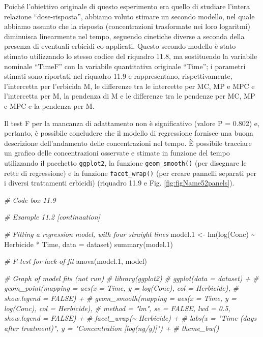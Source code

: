 \documentclass[
  12pt,
]{book}
\newenvironment{Shaded}{\begin{snugshade}}{\end{snugshade}}
\newcommand{\AttributeTok}[1]{\textcolor[rgb]{0.77,0.63,0.00}{#1}}
\newcommand{\CommentTok}[1]{\textcolor[rgb]{0.56,0.35,0.01}{\textit{#1}}}
\newcommand{\FloatTok}[1]{\textcolor[rgb]{0.00,0.00,0.81}{#1}}
\newcommand{\FunctionTok}[1]{\textcolor[rgb]{0.00,0.00,0.00}{#1}}
\newcommand{\NormalTok}[1]{#1}
\newcommand{\OtherTok}[1]{\textcolor[rgb]{0.56,0.35,0.01}{#1}}
\newcommand{\SpecialCharTok}[1]{\textcolor[rgb]{0.00,0.00,0.00}{#1}}
\begin{document}
Poiché l'obiettivo originale di questo esperimento era quello di studiare l'intera relazione ``dose-risposta'', abbiamo voluto stimare un secondo modello, nel quale abbiamo assunto che la risposta (concentrazioni trasformate nei loro logaritmi) diminuisca linearmente nel tempo, seguendo cinetiche diverse a seconda della presenza di eventuali erbicidi co-applicati. Questo secondo modello è stato stimato utilizzando lo stesso codice del riquadro 11.8, ma sostituendo la variabile nominale ``TimeF'' con la variabile quantitativa originale ``Time''; i parametri stimati sono riportati nel riquadro 11.9 e rappresentano, rispettivamente, l'intercetta per l'erbicida M, le differenze tra le intercette per MC, MP e MPC e l'intercetta per M, la pendenza di M e le differenze tra le pendenze per MC, MP e MPC e la pendenza per M.

Il test F per la mancanza di adattamento non è significativo (valore P = 0.802) e, pertanto, è possibile concludere che il modello di regressione fornisce una buona descrizione dell'andamento delle concentrazioni nel tempo. È possibile tracciare un grafico delle concentrazioni osservate e stimate in funzione del tempo utilizzando il pacchetto \texttt{ggplot2}, la funzione \texttt{geom\_smooth()} (per disegnare le rette di regressione) e la funzione \texttt{facet\_wrap()} (per creare pannelli separati per i diversi trattamenti erbicidi) (riquadro 11.9 e Fig. \ref{fig:figName52panels}).

\small
\vspace{12pt}

\begin{Shaded}
\begin{Highlighting}[]
\CommentTok{\# Code box 11.9}

\CommentTok{\# Example 11.2 [continuation]}

\CommentTok{\# Fitting a regression model, with four straight lines}
\NormalTok{model}\FloatTok{.1} \OtherTok{\textless{}{-}} \FunctionTok{lm}\NormalTok{(}\FunctionTok{log}\NormalTok{(Conc) }\SpecialCharTok{\textasciitilde{}}\NormalTok{ Herbicide }\SpecialCharTok{*}\NormalTok{ Time,}
              \AttributeTok{data =}\NormalTok{ dataset) }
\FunctionTok{summary}\NormalTok{(model}\FloatTok{.1}\NormalTok{)}

  
\CommentTok{\# F{-}test for lack{-}of{-}fit}
\FunctionTok{anova}\NormalTok{(model}\FloatTok{.1}\NormalTok{, model)}

\CommentTok{\# Graph of model fits (not run)}
\CommentTok{\# library(ggplot2)}
\CommentTok{\# ggplot(data = dataset) +}
\CommentTok{\#   geom\_point(mapping = aes(x = Time, y = log(Conc), col = Herbicide),}
\CommentTok{\#              show.legend = FALSE) +}
\CommentTok{\#   geom\_smooth(mapping = aes(x = Time, y = log(Conc), col = Herbicide),}
\CommentTok{\#               method = "lm", se = FALSE, lwd = 0.5, show.legend = FALSE) +}
\CommentTok{\#   facet\_wrap(\textasciitilde{} Herbicide) +}
\CommentTok{\#   labs(x = "Time (days after treatment)", y = "Concentration [log(ng/g)]") +}
\CommentTok{\#   theme\_bw()}
\end{Highlighting}
\end{Shaded}
\end{document}
